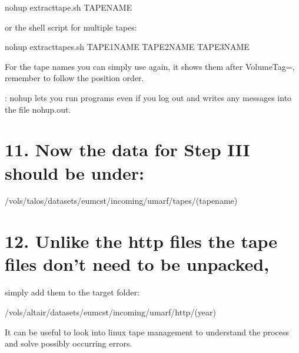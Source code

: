 \documentclass[letterpaper,10pt,english]{sphinxmanual}
\begin{document}
\begin{sphinxVerbatim}[commandchars=\\\{\}]
nohup extract\PYGZbs{}\PYGZus{}tape.sh \PYGZbs{}\PYGZdl{}TAPENAME \PYGZam{}
\end{sphinxVerbatim}

or the shell script  for multiple tapes:

\begin{sphinxVerbatim}[commandchars=\\\{\}]
nohup extract\PYGZbs{}\PYGZus{}tapes.sh \PYGZbs{}\PYGZdl{}TAPE1NAME \PYGZbs{}\PYGZdl{}TAPE2NAME \PYGZbs{}\PYGZdl{}TAPE3NAME \PYGZam{}
\end{sphinxVerbatim}

For the tape names you can simply use  again, it
shows them after VolumeTag=, remember to follow the position order.

: nohup lets you run programs even if you log out and writes any
messages into the file nohup.out.


\section{11. Now the data for Step III should be under:}
\label{\detokenize{extract_tapes:now-the-data-for-step-iii-should-be-under}}
\begin{sphinxVerbatim}[commandchars=\\\{\}]
/vols/talos/datasets/eumcst/incoming/umarf/tapes/(tapename)
\end{sphinxVerbatim}


\section{12. Unlike the http files the tape files don’t need to be unpacked,}
\label{\detokenize{extract_tapes:unlike-the-http-files-the-tape-files-don-t-need-to-be-unpacked}}
simply add them to the target folder:

\begin{sphinxVerbatim}[commandchars=\\\{\}]
/vols/altair/datasets/eumcst/incoming/umarf/http/(year)
\end{sphinxVerbatim}

 It can be useful to look into linux tape management to
understand the process and solve possibly occurring errors.
\end{document}
